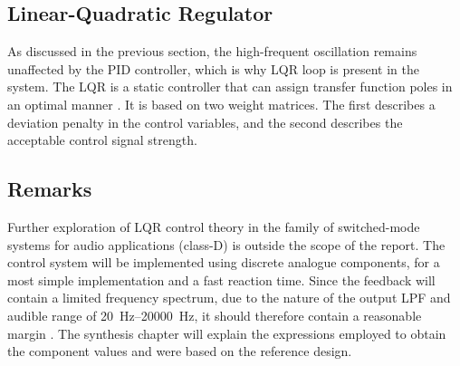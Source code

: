 \subsection{Linear-Quadratic Regulator}
As discussed in the previous section, the high-frequent oscillation remains unaffected by the PID controller, which is why LQR loop is present in the system. The LQR is a static controller that can assign transfer function poles in an optimal manner \cite{multivar_ctrl_loops_for_SM_audio_systems}. It is based on two weight matrices. The first describes a deviation penalty in the control variables, and the second describes the acceptable control signal strength. 

\subsection{Remarks}
Further exploration of LQR control theory in the family of switched-mode systems for audio applications (class-D) is outside the scope of the report. The control system will be implemented using discrete analogue components, for a most simple implementation and a fast reaction time. Since the feedback will contain a limited frequency spectrum, due to the nature of the output LPF and audible range of \SIrange[scientific-notation = engineering]{20}{20000}{\hertz}, it should therefore contain a reasonable margin \cite{optimal_ctrl_hf_classd_amp}. The synthesis chapter will explain the expressions employed to obtain the component values and were based on the reference design. 